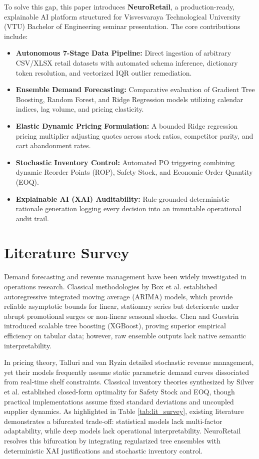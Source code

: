 \documentclass[conference]{IEEEtran}
\begin{document}
To solve this gap, this paper introduces \textbf{NeuroRetail}, a production-ready, explainable AI platform structured for Visvesvaraya Technological University (VTU) Bachelor of Engineering seminar presentation. The core contributions include:
\begin{itemize}
    \item \textbf{Autonomous 7-Stage Data Pipeline:} Direct ingestion of arbitrary CSV/XLSX retail datasets with automated schema inference, dictionary token resolution, and vectorized IQR outlier remediation.
    \item \textbf{Ensemble Demand Forecasting:} Comparative evaluation of Gradient Tree Boosting, Random Forest, and Ridge Regression models utilizing calendar indices, lag volume, and pricing elasticity.
    \item \textbf{Elastic Dynamic Pricing Formulation:} A bounded Ridge regression pricing multiplier adjusting quotes across stock ratios, competitor parity, and cart abandonment rates.
    \item \textbf{Stochastic Inventory Control:} Automated PO triggering combining dynamic Reorder Points (ROP), Safety Stock, and Economic Order Quantity (EOQ).
    \item \textbf{Explainable AI (XAI) Auditability:} Rule-grounded deterministic rationale generation logging every decision into an immutable operational audit trail.
\end{itemize}

\section{Literature Survey}
Demand forecasting and revenue management have been widely investigated in operations research. Classical methodologies by Box et al. \cite{box2015} established autoregressive integrated moving average (ARIMA) models, which provide reliable asymptotic bounds for linear, stationary series but deteriorate under abrupt promotional surges or non-linear seasonal shocks. Chen and Guestrin \cite{chen2016} introduced scalable tree boosting (XGBoost), proving superior empirical efficiency on tabular data; however, raw ensemble outputs lack native semantic interpretability.

In pricing theory, Talluri and van Ryzin \cite{talluri2018} detailed stochastic revenue management, yet their models frequently assume static parametric demand curves dissociated from real-time shelf constraints. Classical inventory theories synthesized by Silver et al. \cite{silver2020} established closed-form optimality for Safety Stock and EOQ, though practical implementations assume fixed standard deviations and uncoupled supplier dynamics. As highlighted in Table \ref{tab:lit_survey}, existing literature demonstrates a bifurcated trade-off: statistical models lack multi-factor adaptability, while deep models lack operational interpretability. NeuroRetail resolves this bifurcation by integrating regularized tree ensembles with deterministic XAI justifications and stochastic inventory control.
\end{document}
